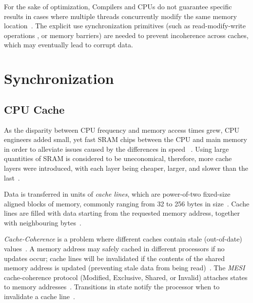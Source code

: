For the sake of optimization, Compilers and CPUs do not guarantee specific
results in cases where multiple threads concurrently modify the same memory location~\citep{drepper2007every}. The explicit use synchronization primitives (such as read-modify-write operations
, or memory barriers) are needed to prevent incoherence
across caches, which may eventually lead to corrupt data.

\pagebreak

\section{Synchronization}
\subsection{CPU Cache}
As the disparity between CPU frequency and memory access times grew, 
CPU engineers added small, yet fast SRAM chips between the CPU
and main memory in order to alleviate issues caused by the differences in speed
~\citep{cantrill2008real,drepper2007every,perfbook2021}. Using large
quantities of SRAM is considered to be uneconomical, therefore, more cache layers
were introduced, with each layer being cheaper, larger, and slower than the
last~\citep{drepper2007every,perfbook2021}.

Data is transferred in units of \emph{cache lines}, which are power-of-two
fixed-size aligned blocks of memory, commonly ranging from 32 to 256 bytes in
size~\citep[Section~3.2.1]{perfbook2021}. Cache lines are filled with data
starting from the requested memory address, together with neighbouring bytes~\citep[Section~3.2.1]{perfbook2021}.


\emph{Cache-Coherence} is a problem where different caches contain stale
(out-of-date) values~\citep[Appendix~B.5.1]{herlihy2020art}. A memory address
may safely cached in different processors if no updates
occur; cache lines will be
invalidated if the contents of the shared memory address is updated (preventing
stale data from being read)~\citep[Appendix~B.5.1]{herlihy2020art}. The
\emph{MESI} cache-coherence protocol (Modified, Exclusive, Shared,
or Invalid) attaches states to memory addresses~\citep[Appendix~B.5.1]{herlihy2020art}. Transitions in
state notify the processor when to invalidate a cache line~\citep[Appendix~B.5.1]{herlihy2020art}.

